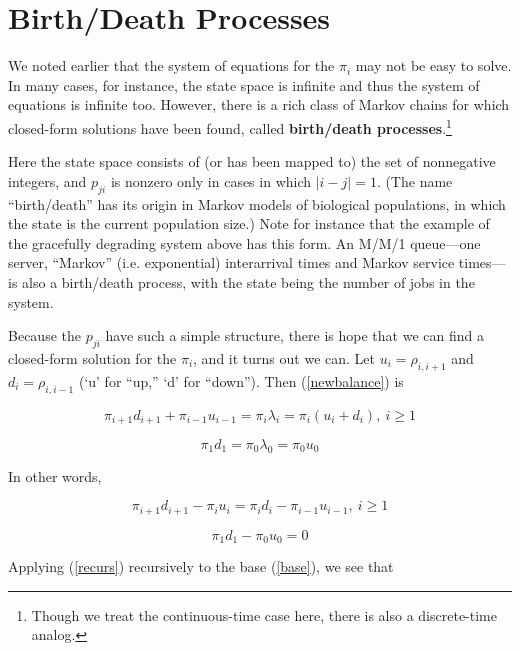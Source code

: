 \section{Birth/Death Processes}

We noted earlier that the system of equations for the $\pi_i$ may not be
easy to solve. In many cases, for instance, the state space is infinite
and thus the system of equations is infinite too. However, there is a
rich class of Markov chains for which closed-form solutions have been
found, called \textbf{birth/death processes}.\footnote{Though we treat
the continuous-time case here, there is also a discrete-time analog.} 

Here the state space consists of (or has been mapped to) the
set of nonnegative integers, and $p_{ji}$ is nonzero only in cases in
which $|i-j| = 1$. (The name ``birth/death'' has its origin in Markov
models of biological populations, in which the state is the current
population size.) Note for instance that the example of the gracefully
degrading system above has this form. An M/M/1 queue---one server,
``Markov'' (i.e.  exponential) interarrival times and Markov service
times---is also a birth/death process, with the state being the number
of jobs in the system.

Because the $p_{ji}$ have such a simple structure, there is hope that we
can find a closed-form solution for the $\pi_i$, and it turns out we
can.  Let $u_i = \rho_{i,i+1}$ and $d_i = \rho_{i,i-1}$ (`u' for ``up,''
`d' for ``down'').  Then (\ref{newbalance}) is

\begin{equation}
\pi_{i+1} d_{i+1} + \pi_{i-1} u_{i-1} = \pi_i \lambda_i 
= \pi_i (u_i+d_i), ~ i \geq 1
\end{equation}

\begin{equation}
\pi_1 d_1 = \pi_0 \lambda_0 = \pi_0 u_0
\end{equation}

In other words,

\begin{equation}
\label{recurs}
\pi_{i+1} d_{i+1} - \pi_i u_i = \pi_i d_i - \pi_{i-1} u_{i-1}, ~ i \geq 1
\end{equation}

\begin{equation}
\label{base}
\pi_1 d_1 - \pi_0 u_0 = 0
\end{equation}

Applying (\ref{recurs}) recursively to the base (\ref{base}), we see
that


